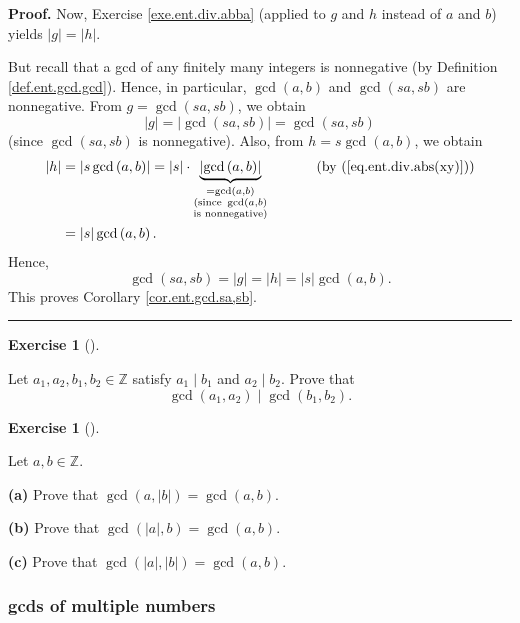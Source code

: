 \documentclass[numbers=enddot,12pt,final,onecolumn,notitlepage]{scrartcl}%
\newcounter{exer}
\numberwithin{exer}{subsection}
\theoremstyle{definition}
\newtheorem{exmp}[exer]{Exercise}
\newenvironment{exercise}[1][]
{\begin{exmp}[#1]\begin{leftbar}}
{\end{leftbar}\end{exmp}}
\newenvironment{proof}[1][Proof]{\noindent\textbf{#1.} }{\ \rule{0.5em}{0.5em}}
\begin{document}
\begin{proof}
Now, Exercise \ref{exe.ent.div.abba} (applied to $g$ and $h$ instead of $a$
and $b$) yields $\left\vert g\right\vert =\left\vert h\right\vert $.

But recall that a gcd of any finitely many integers is nonnegative (by
Definition \ref{def.ent.gcd.gcd}). Hence, in particular, $\gcd\left(
a,b\right)  $ and $\gcd\left(  sa,sb\right)  $ are nonnegative. From
$g=\gcd\left(  sa,sb\right)  $, we obtain%
\[
\left\vert g\right\vert =\left\vert \gcd\left(  sa,sb\right)  \right\vert
=\gcd\left(  sa,sb\right)
\]
(since $\gcd\left(  sa,sb\right)  $ is nonnegative). Also, from $h=s\gcd
\left(  a,b\right)  $, we obtain%
\begin{align*}
\left\vert h\right\vert  &  =\left\vert s\gcd\left(  a,b\right)  \right\vert
=\left\vert s\right\vert \cdot\underbrace{\left\vert \gcd\left(  a,b\right)
\right\vert }_{\substack{=\gcd\left(  a,b\right)  \\\text{(since }\gcd\left(
a,b\right)  \\\text{is nonnegative)}}}\ \ \ \ \ \ \ \ \ \ \left(  \text{by
(\ref{eq.ent.div.abs(xy)})}\right) \\
&  =\left\vert s\right\vert \gcd\left(  a,b\right)  .
\end{align*}
Hence,
\[
\gcd\left(  sa,sb\right)  =\left\vert g\right\vert =\left\vert h\right\vert
=\left\vert s\right\vert \gcd\left(  a,b\right)  .
\]
This proves Corollary \ref{cor.ent.gcd.sa,sb}.
\end{proof}

\begin{exercise}
\label{exe.ent.gcd.div}Let $a_{1},a_{2},b_{1},b_{2}\in\mathbb{Z}$ satisfy
$a_{1}\mid b_{1}$ and $a_{2}\mid b_{2}$. Prove that%
\[
\gcd\left(  a_{1},a_{2}\right)  \mid\gcd\left(  b_{1},b_{2}\right)  .
\]

\end{exercise}

\begin{exercise}
\label{exe.ent.gcd.abs}Let $a,b\in\mathbb{Z}$.

\textbf{(a)} Prove that $\gcd\left(  a,\left\vert b\right\vert \right)
=\gcd\left(  a,b\right)  $.

\textbf{(b)} Prove that $\gcd\left(  \left\vert a\right\vert ,b\right)
=\gcd\left(  a,b\right)  $.

\textbf{(c)} Prove that $\gcd\left(  \left\vert a\right\vert ,\left\vert
b\right\vert \right)  =\gcd\left(  a,b\right)  $.
\end{exercise}

\subsubsection{gcds of multiple numbers}
\end{document}
